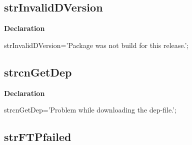 \documentclass{report}
\newif\ifpdf
\begin{document}
\subsection*{strInvalidDVersion}
\fi
\label{trstrings-strInvalidDVersion}
\begin{list}{}{
\setlength{\itemindent}{0cm}
\setlength{\listparindent}{0cm}
\setlength{\leftmargin}{\evensidemargin}
\addtolength{\leftmargin}{\tmplength}
\settowidth{\labelsep}{X}
\addtolength{\leftmargin}{\labelsep}
\setlength{\labelwidth}{\tmplength}
}
\item[\textbf{Declaration}\hfill]
\ifpdf
\begin{flushleft}
\fi
\begin{ttfamily}
strInvalidDVersion='Package was not build for this release.';\end{ttfamily}

\ifpdf
\end{flushleft}
\fi

\end{list}
\ifpdf
\subsection*{\large{\textbf{strcnGetDep}}\normalsize\hspace{1ex}\hrulefill}
\else
\subsection*{strcnGetDep}
\fi
\label{trstrings-strcnGetDep}
\begin{list}{}{
\setlength{\itemindent}{0cm}
\setlength{\listparindent}{0cm}
\setlength{\leftmargin}{\evensidemargin}
\addtolength{\leftmargin}{\tmplength}
\settowidth{\labelsep}{X}
\addtolength{\leftmargin}{\labelsep}
\setlength{\labelwidth}{\tmplength}
}
\item[\textbf{Declaration}\hfill]
\ifpdf
\begin{flushleft}
\fi
\begin{ttfamily}
strcnGetDep='Problem while downloading the dep-file.';\end{ttfamily}

\ifpdf
\end{flushleft}
\fi

\end{list}
\ifpdf
\subsection*{\large{\textbf{strFTPfailed}}\normalsize\hspace{1ex}\hrulefill}
\else
\end{document}
